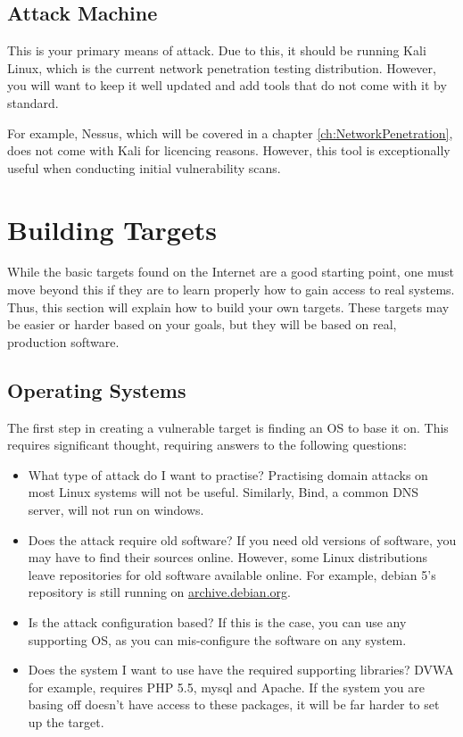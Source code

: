 		\subsection{Attack Machine}
			This is your primary means of attack. 
			Due to this, it should be running Kali Linux, which is the current network penetration testing distribution. 
			However, you will want to keep it well updated and add tools that do not come with it by standard. 

			For example, Nessus, which will be covered in a chapter \ref{ch:NetworkPenetration}, 
			does not come with Kali for licencing reasons. 
			However, this tool is exceptionally useful when conducting initial vulnerability scans. 


	\section{Building Targets}
		While the basic targets found on the Internet are a good starting point, one must move beyond this if they are to learn properly how to gain access to real systems. 
		Thus, this section will explain how to build your own targets. 
		These targets may be easier or harder based on your goals, but they will be based on real, production software. 

		\subsection{Operating Systems}
			The first step in creating a vulnerable target is finding an OS to base it on. 
			This requires significant thought, requiring answers to the following questions:
			\begin{itemize}
				\item What type of attack do I want to practise?
					Practising domain attacks on most Linux systems will not be useful. 
					Similarly, Bind, a common DNS server, will not run on windows. 
				\item Does the attack require old software?
					If you need old versions of software, you may have to find their sources online. 
					However, some Linux distributions leave repositories for old software available online. 
					For example, debian 5's repository is still running on \url{archive.debian.org}.
				\item Is the attack configuration based?
					If this is the case, you can use any supporting OS, as you can mis-configure the software on any system. 
				\item Does the system I want to use have the required supporting libraries?
					DVWA for example, requires PHP 5.5, mysql and Apache. 
					If the system you are basing off doesn't have access to these packages, it will be far harder to set up the target. 
			\end{itemize}
